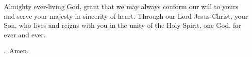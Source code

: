 \lettrine[lines=3]{A}{}lmighty ever-living God, grant that we may always conform our will to yours and serve your majesty in sincerity of heart. Through our Lord Jesus Christ, your Son, who lives and reigns with you in the unity of the Holy Spirit, one God, for ever and ever. \par \Rbar.~Amen.
